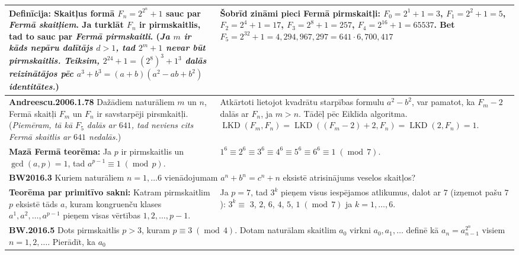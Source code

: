\documentclass[a4paper]{article}
\begin{document}
\renewcommand{\arraystretch}{1.2}
\begin{table}[ht!]\centering
{\small
\begin{tabular*}{18.46cm}{@{}|p{10.35cm}|p{7.25cm}|@{}} \hline
{\bf Definīcija:} Skaitļus formā $F_n=2^{2^n}+1$ sauc par {\em Fermā skaitļiem}. 
Ja turklāt $F_n$ ir pirmskaitlis, tad to sauc par {\em Fermā pirmskaitli}.\newline
({\em Ja $m$ ir kāds nepāru dalītājs $d>1$, tad $2^m+1$ nevar būt pirmskaitlis. 
Teiksim, $2^{24}+1=(2^8)^3+1^3$ dalās reizinātājos pēc $a^3+b^3=(a+b)(a^2-ab+b^2)$ identitātes.})
&
Šobrīd zināmi pieci Fermā pirmskaitļi: $F_0=2^1+1=3$, $F_1=2^2+1=5$, 
$F_2=2^4+1=17$, $F_3=2^8+1=257$, $F_4=2^{16}+1=65537$. Bet 
$F_5=2^{32}+1=4,294,967,297=641\cdot{}6,700,417$ \\ \hline
\cellcolor[HTML]{E1FFE1}
{\bf Andreescu.2006.1.78} Dažādiem naturāliem $m$ un $n$, Fermā skaitļi 
$F_m$ un $F_n$ ir savstarpēji pirsmkaitļi.\newline ({\em Piemēram, tā kā 
$F_5$ dalās ar $641$, tad neviens cits Fermā skaitlis ar $641$ nedalās.}) & 
Atkārtoti lietojot kvadrātu starpības formulu $a^2-b^2$, var pamatot, ka
$F_m-2$ dalās ar $F_n$, ja $m>n$. Tādēļ pēc Eiklīda algoritma. 
$\operatorname{LKD}(F_m,F_n)=\operatorname{LKD}((F_m-2)+2,F_n)=
\operatorname{LKD}(2,F_n)=1$. \\ \hline
{\bf Mazā Fermā teorēma:} Ja $p$ ir pirmskaitlis un $\operatorname{gcd}(a,p)=1$, tad 
$a^{p-1} \equiv 1\;(\operatorname{mod}\,p)$. &
$1^6 \equiv 2^6 \equiv 3^6 \equiv 4^6 \equiv 5^6 \equiv 6^6 \equiv 1\;(\operatorname{mod}\,7)$. \\ \hline
\multicolumn{2}{|p{18.05cm}|}{
\cellcolor[HTML]{E1FFE1}
{\bf BW2016.3} Kuriem naturāliem $n=1,\ldots{}6$ vienādojumam
$a^n + b^n = c^n + n$ eksistē atrisinājums veselos skaitļos?
} \\ \hline
{\bf Teorēma par primitīvo sakni:} Katram pirmskaitlim $p$ eksistē tāds 
$a$, kuram kongruenču klases $a^1,a^2,\ldots,a^{p-1}$ pieņem visas
vērtības $1,2,\ldots,p-1$. &
Ja $p=7$, tad $3^k$ pieņem visus iespējamos atlikumus, dalot ar $7$ (izņemot pašu $7$):\newline
$3^k \equiv$ $3$, $2$, $6$, $4$, $5$, $1\;(\operatorname{mod}\,7)$ ja $k=1,\ldots,6$. \\ \hline
\multicolumn{2}{|p{18.05cm}|}{
\cellcolor[HTML]{E1FFE1}
{\bf BW.2016.5} Dots pirmskaitlis $p > 3$, kuram $p \equiv 3\;(\operatorname{mod}\,4)$. Dotam naturālam
skaitlim $a_0$ virkni $a_0,a_1,\ldots$ definē kā $a_n=a_{n-1}^{2^n}$ visiem $n=1,2,\ldots$. Pierādīt, ka $a_0$ 
}
\end{tabular*}}
\end{table}
\end{document}
